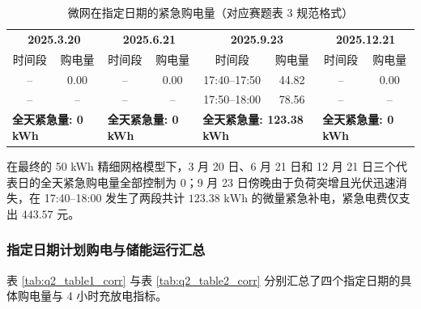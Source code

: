 \documentclass[withoutpreface]{cumcmthesis}
\begin{document}
\begin{table}[htbp]
\centering
\renewcommand{\arraystretch}{1.2}
\caption{微网在指定日期的紧急购电量（对应赛题表 3 规范格式）}
\label{tab:q2_table3}
\begin{tabular*}{\textwidth}{@{\extracolsep{\fill}}cccccccc@{}}
\toprule[1.5pt]
\multicolumn{2}{c}{\textbf{2025.3.20}} & \multicolumn{2}{c}{\textbf{2025.6.21}} & \multicolumn{2}{c}{\textbf{2025.9.23}} & \multicolumn{2}{c}{\textbf{2025.12.21}} \\
时间段 & 购电量 & 时间段 & 购电量 & 时间段 & 购电量 & 时间段 & 购电量 \\
\midrule[1pt]
-- & 0.00 & -- & 0.00 & 17:40--17:50 & 44.82 & -- & 0.00 \\
-- & --   & -- & --   & 17:50--18:00 & 78.56 & -- & --   \\
\midrule[0.5pt]
\multicolumn{2}{l}{\textbf{全天紧急量: 0 kWh}} & \multicolumn{2}{l}{\textbf{全天紧急量: 0 kWh}} & \multicolumn{2}{l}{\textbf{全天紧急量: 123.38 kWh}} & \multicolumn{2}{l}{\textbf{全天紧急量: 0 kWh}} \\
\bottomrule[1.5pt]
\end{tabular*}
\end{table}

在最终的 50 kWh 精细网格模型下，3 月 20 日、6 月 21 日和 12 月 21 日三个代表日的全天紧急购电量全部控制为 0；9 月 23 日傍晚由于负荷突增且光伏迅速消失，在 17:40--18:00 发生了两段共计 $123.38\text{ kWh}$ 的微量紧急补电，紧急电费仅支出 $443.57\text{ 元}$。

\subsubsection{指定日期计划购电与储能运行汇总}
表 \ref{tab:q2_table1_corr} 与表 \ref{tab:q2_table2_corr} 分别汇总了四个指定日期的具体购电量与 4 小时充放电指标。
\end{document}
